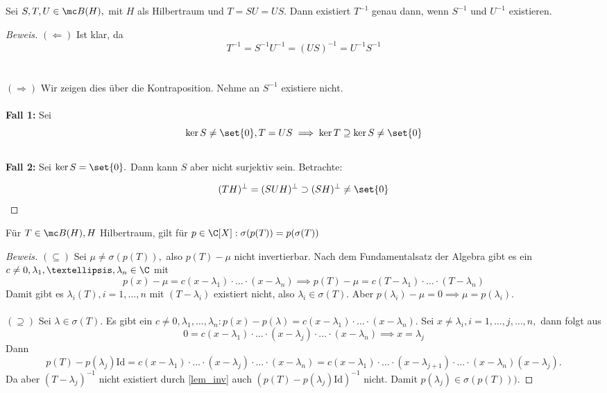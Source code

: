 
\begin{lemma} Sei $S, T, U \in \mc B(H),$ mit $H$ als Hilbertraum und $T = SU = US.$ Dann existiert $T^{-1}$ genau dann, wenn $S^{-1}$ und $U^{-1}$ existieren. 
	
	
	\begin{proof}[Beweis] $(\Leftarrow)$ Ist klar, da \[T^{-1} = S^{-1}U^{-1} = (US)^{-1} = U^{-1}S^{-1}\] \\ \\
		
		$(\Rightarrow)$ Wir zeigen dies über die Kontraposition. Nehme an $S^{-1}$ existiere nicht. \\ \\
		
		\textbf{Fall 1:} Sei \[\ker{S} \not= \set{0}, T = US \implies \ker{T} \supseteq \ker{S} \not= \set{0}\] \\
		
		\textbf{Fall 2:} Sei $\ker{S} = \set{0}.$ Dann kann $S$ aber nicht surjektiv sein. Betrachte:
		
		\[(TH)^{\perp} = (SUH)^{\perp} \supset (SH)^{\perp} \not= \set{0}\] 
		
		
	\end{proof}
	
\end{lemma}


\begin{theorem} \label{lem_inv} Für $T \in \mc B(H), H$ Hilbertraum, gilt für $p \in \C[X]: \sigma(p(T))= p(\sigma(T))$
	
	
	\begin{proof}[Beweis] $(\subseteq)$ Sei $\mu \not= \sigma(p(T)),$ also $p(T)-\mu$ nicht invertierbar. Nach dem Fundamentalsatz der Algebra gibt es ein $c \not= 0, \lambda_1, …, \lambda_n \in \C$ mit \[p(x)- \mu = c(x- \lambda_1)\cdot \dots \cdot (x- \lambda_n) \implies p(T)-\mu = c(T-\lambda_1) \cdot … \cdot (T- \lambda_n)\]
	Damit gibt es $\lambda_i (T), i = 1, …, n$ mit $(T- \lambda_i)$ existiert nicht, also $\lambda_i \in \sigma(T).$ Aber $p(\lambda_i)- \mu = 0 \implies \mu = p(\lambda_i).$ \\ \\
	$(\supseteq)$ Sei $\lambda \in \sigma(T).$ Es gibt ein $c \not= 0, \lambda_1, …, \lambda_n: p(x)-p(\lambda) = c(x-\lambda_1)\cdot \dots \cdot (x- \lambda_n).$ Sei $x \not= \lambda_i, i = 1, \dots,j, \dots, n,$ dann folgt aus \[0 = c(x- \lambda_1)\cdot \dots \cdot (x- \lambda_j) \cdot \dots \cdot (x- \lambda_n) \implies x= \lambda_j\]
	Dann \[p(T)-p(\lambda_j)\text{Id} = c(x- \lambda_1)\cdot \dots \cdot (x- \lambda_j) \cdot \dots \cdot (x- \lambda_n) = c(x- \lambda_1)\cdot \dots \cdot (x- \lambda_{j+1}) \cdot \dots \cdot (x- \lambda_n) (x- \lambda_j).\] Da aber $(T-\lambda_j)^{-1}$ nicht  existiert durch \ref{lem_inv} auch $(p(T)-p(\lambda_j)\text{Id})^{-1}$ nicht. Damit $p(\lambda_j )\in \sigma(p(T))).$
		
	\end{proof}
	
\end{theorem}



